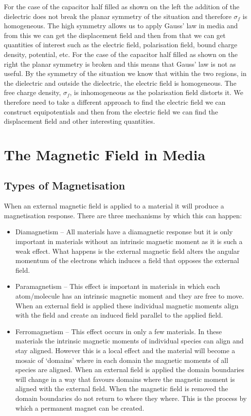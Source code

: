     For the case of the capacitor half filled as shown on the left the addition of the dielectric does not break the planar symmetry of the situation and therefore \(\sigma_f\) is homogeneous.
    The high symmetry allows us to apply Gauss' law in media and from this we can get the displacement field and then from that we can get quantities of interest such as the electric field, polarisation field, bound charge density, potential, etc.
    For the case of the capacitor half filled as shown on the right the planar symmetry is broken and this means that Gauss' law is not as useful.
    By the symmetry of the situation we know that within the two regions, in the dielectric and outside the dielectric, the electric field is homogeneous.
    The free charge density, \(\sigma_f\), is inhomogeneous as the polarisation field distorts it.
    We therefore need to take a different approach to find the electric field we can construct equipotentials and then from the electric field we can find the displacement field and other interesting quantities.
    
    \section{The Magnetic Field in Media}
    \subsection{Types of Magnetisation}
    When an external magnetic field is applied to a material it will produce a magnetisation response.
    There are three mechanisms by which this can happen:
    \begin{itemize}
        \item Diamagnetism -- All materials have a diamagnetic response but it is only important in materials without an intrinsic magnetic moment as it is such a weak effect.
        What happens is the external magnetic field alters the angular momentum of the electrons which induces a field that opposes the external field.
        
        \item Paramagnetism -- This effect is important in materials in which each atom/molecule has an intrinsic magnetic moment and they are free to move.
        When an external field is applied these individual magnetic moments align with the field and create an induced field parallel to the applied field.
        
        \item Ferromagnetism -- This effect occurs in only a few materials.
        In these materials the intrinsic magnetic moments of individual species can align and stay aligned.
        However this is a local effect and the material will become a mosaic of `domains' where in each domain the magnetic moments of all species are aligned.
        When an external field is applied the domain boundaries will change in a way that favours domains where the magnetic moment is aligned with the external field.
        When the magnetic field is removed the domain boundaries do not return to where they where.
        This is the process by which a permanent magnet can be created.
    \end{itemize}
    

